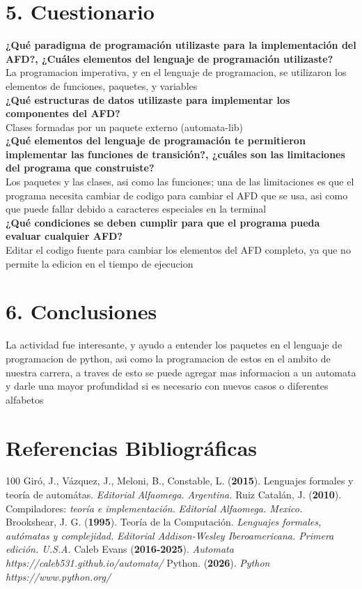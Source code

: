\documentclass{article}
\begin{document}
\section{5. Cuestionario}

\textbf{¿Qué paradigma de programación utilizaste para la implementación del AFD?, ¿Cuáles elementos 
del lenguaje de programación utilizaste? } \\
La programacion imperativa, y en el lenguaje de programacion, se utilizaron los elementos de funciones, paquetes, y variables \\
\textbf{¿Qué estructuras de datos utilizaste para implementar los componentes del AFD? } \\
Clases formadas por un paquete externo (automata-lib) \\
\textbf{¿Qué elementos del lenguaje de programación te permitieron implementar las funciones de transición?, ¿cuáles son las limitaciones del programa que construiste? } \\
Los paquetes y las clases, asi como las funciones; una de las limitaciones es que el programa necesita cambiar de codigo para cambiar el AFD que se usa, asi como que puede fallar debido a caracteres especiales en la terminal \\
\textbf{¿Qué condiciones se deben cumplir para que el programa pueda evaluar cualquier AFD?} \\
Editar el codigo fuente para cambiar los elementos del AFD completo, ya que no permite la edicion en el tiempo de ejecucion 
    
\section{6. Conclusiones}
    La actividad fue interesante, y ayudo a entender los paquetes en el lenguaje de programacion de python, asi como la programacion de estos en el ambito de nuestra carrera, a traves de esto se puede agregar mas informacion a un automata y darle una mayor profundidad si es necesario con nuevos casos o diferentes alfabetos 
    
\section{Referencias Bibliográficas}
    \begin{thebibliography}{100}
Giró, J., Vázquez, J., Meloni, B., Constable, L.  ({\bf 2015}). Lenguajes formales y teoría de automátas. {\em Editorial Alfaomega. Argentina. }
Ruiz Catalán, J. ({\bf 2010}). Compiladores: \textit{teoría e implementación.} {\em Editorial Alfaomega. Mexico. }
Brookshear, J. G. ({\bf 1995}). Teoría de la Computación. \textit{Lenguajes formales, autómatas 
y complejidad.} {\em Editorial Addison-Wesley Iberoamericana. Primera edición. U.S.A.  }
Caleb Evans ({\bf 2016-2025}). \textit{Automata} {\em https://caleb531.github.io/automata/}
Python. ({\bf 2026}). \textit{Python} {\em https://www.python.org/}
    \end{thebibliography}
\end{document}
